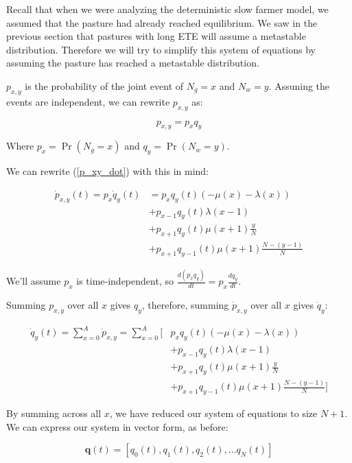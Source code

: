 \documentclass{article}
\begin{document}
Recall that when we were analyzing the deterministic slow farmer model, we assumed that the pasture had already reached equilibrium. We saw in the previous section that pastures with long ETE will assume a metastable distribution. Therefore we will try to simplify this system of equations by assuming the pasture has reached a metastable distribution.

$p_{x,y}$ is the probability of the joint event of $N_g=x$ and $N_w=y$. Assuning the events are independent, we can rewrite $p_{x,y}$ as:

$$p_{x,y}=p_xq_y$$

Where $p_x=\Pr(N_g=x)$ and $q_y=\Pr(N_w=y)$.

We can rewrite (\ref{p_xy_dot}) with this in mind:

\begin{equation*}
    \begin{split}
        \dot{p}_{x,y}(t)=p_x\dot{q}_y(t)&=p_xq_y(t)(-\mu(x)-\lambda(x))\\
        &+p_{x-1}q_y(t)\lambda(x-1)\\
        &+p_{x+1}q_y(t)\mu(x+1)\frac{y}{N}\\
        &+p_{x+1}q_{y-1}(t)\mu(x+1)\frac{N-(y-1)}{N}
    \end{split}
\end{equation*}

We'll assume $p_x$ is time-independent, so $\frac{d(p_xq_y)}{dt}=p_x\frac{dq_y}{dt}$.

Summing $p_{x,y}$ over all $x$ gives $q_y$, therefore, summing $\dot{p}_{x,y}$ over all $x$ gives $\dot{q}_y$:


\begin{equation}
    \begin{split}
        \dot{q}_y(t)=\sum_{x=0}^{A}\dot{p}_{x,y}=\sum_{x=0}^{A}[&p_xq_y(t)(-\mu(x)-\lambda(x))\\
        &+p_{x-1}q_y(t)\lambda(x-1)\\
        &+p_{x+1}q_y(t)\mu(x+1)\frac{y}{N}\\
        &+p_{x+1}q_{y-1}(t)\mu(x+1)\frac{N-(y-1)}{N}]
    \end{split}
\end{equation}

By summing across all $x$, we have reduced our system of equations to size $N+1$. We can express our system in vector form, as before:

$$\mathbf{q}(t)=[q_0(t), q_1(t), q_2(t), \dots q_N(t)]$$
\end{document}
